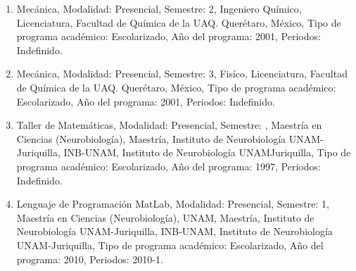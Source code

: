 \begin{enumerate}
\item Mecánica, Modalidad: Presencial, Semestre: 2, Ingeniero Químico, Licenciatura, Facultad de Química de la UAQ. 
Querétaro, México, Tipo de programa académico: Escolarizado, Año del programa: 2001, Periodos: Indefinido.

\item Mecánica, Modalidad: Presencial, Semestre: 3, Fisíco, Licenciatura, Facultad de Química de la UAQ. Querétaro, México, 
Tipo de programa académico: Escolarizado, Año del programa: 2001, Periodos: Indefinido.

\item Taller de Matemáticas, Modalidad: Presencial, Semestre: , Maestría en Ciencias (Neurobiología), Maestría, Instituto de 
Neurobiología UNAM-Juriquilla, INB-UNAM, Instituto de Neurobiología UNAMJuriquilla, Tipo de programa académico: 
Escolarizado, Año del programa: 1997, Periodos: Indefinido.

\item Lenguaje de Programación MatLab, Modalidad: Presencial, Semestre: 1, Maestría en Ciencias (Neurobiología), UNAM, 
Maestría, Instituto de Neurobiología UNAM-Juriquilla, INB-UNAM, Instituto de Neurobiología UNAM-Juriquilla, Tipo de 
programa académico: Escolarizado, Año del programa: 2010, Periodos: 2010-1.


\end{enumerate}
